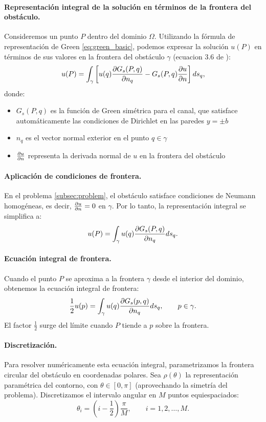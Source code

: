 \documentclass[11pt]{article}
\begin{document}
\paragraph{Representación integral de la solución en términos de la frontera del obstáculo.} Consideremos un punto $P$ dentro del dominio $\Omega$. Utilizando la fórmula de representación de Green \ref{eq:green_basic}, podemos expresar la solución $u(P)$ en términos de sus valores en la frontera del obstáculo $\gamma$ (ecuacion 3.6 de \cite{Linton1992}):
\begin{equation}
u(P) = \int_{\gamma} \left[ u(q) \pdv{G_s(P,q)}{n_q} - G_s(P,q) \pdv{u}{n}(q) \right] ds_q,
\end{equation}
donde:
\begin{itemize}
    \item $G_s(P,q)$ es la función de Green simétrica para el canal, que satisface automáticamente las condiciones de Dirichlet en las paredes $y = \pm b$
    \item $n_q$ es el vector normal exterior en el punto $q \in \gamma$
    \item $\pdv{u}{n}(q)$ representa la derivada normal de $u$ en la frontera del obstáculo
\end{itemize}

\paragraph{Aplicación de condiciones de frontera.} En el problema \ref{subsec:problem}, el obstáculo satisface condiciones de Neumann homogéneas, es decir, $\pdv{u}{n} = 0$ en $\gamma$. Por lo tanto, la representación integral se simplifica a:
\begin{equation}
u(P) = \int_{\gamma} u(q) \pdv{G_s(P,q)}{n_q} ds_q.
\end{equation}

\paragraph{Ecuación integral de frontera.} Cuando el punto $P$ se aproxima a la frontera $\gamma$ desde el interior del dominio, obtenemos la ecuación integral de frontera:
\begin{equation}
\frac{1}{2} u(p) = \int_{\gamma} u(q) \pdv{G_s(p,q)}{n_q} ds_q, \qquad p \in \gamma.
\end{equation}
El factor $\frac{1}{2}$ surge del límite cuando $P$ tiende a $p$ sobre la frontera.

\paragraph{Discretización.} Para resolver numéricamente esta ecuación integral, parametrizamos la frontera circular del obstáculo en coordenadas polares. Sea $\rho(\theta)$ la representación paramétrica del contorno, con $\theta \in [0, \pi]$ (aprovechando la simetría del problema). Discretizamos el intervalo angular en $M$ puntos equiespaciados:
\begin{equation}
\theta_i = \left(i - \frac{1}{2}\right)\frac{\pi}{M}, \qquad i = 1, 2, \dots, M.
\end{equation}
\end{document}
